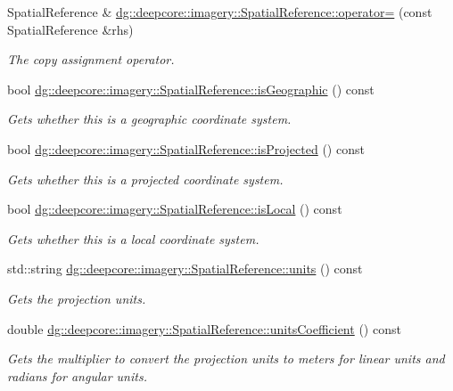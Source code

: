 \begin{DoxyCompactItemize}
Spatial\+Reference \& \hyperlink{group___imagery_module_ga57789396d3366fae0ec1fdc83832ee5b}{dg\+::deepcore\+::imagery\+::\+Spatial\+Reference\+::operator=} (const Spatial\+Reference \&rhs)
\begin{DoxyCompactList}\small\item\em The copy assignment operator. \end{DoxyCompactList}\item 
bool \hyperlink{group___imagery_module_ga2fcc958cf2ef9ab876162ac40df35913}{dg\+::deepcore\+::imagery\+::\+Spatial\+Reference\+::is\+Geographic} () const 
\begin{DoxyCompactList}\small\item\em Gets whether this is a geographic coordinate system. \end{DoxyCompactList}\item 
bool \hyperlink{group___imagery_module_ga0344d276d07a4f5a0ae3ae113a89026d}{dg\+::deepcore\+::imagery\+::\+Spatial\+Reference\+::is\+Projected} () const 
\begin{DoxyCompactList}\small\item\em Gets whether this is a projected coordinate system. \end{DoxyCompactList}\item 
bool \hyperlink{group___imagery_module_gad4b4d9d82c2ab268d523048576a1655e}{dg\+::deepcore\+::imagery\+::\+Spatial\+Reference\+::is\+Local} () const 
\begin{DoxyCompactList}\small\item\em Gets whether this is a local coordinate system. \end{DoxyCompactList}\item 
std\+::string \hyperlink{group___imagery_module_gac88786aa96148f649fc063229cebba89}{dg\+::deepcore\+::imagery\+::\+Spatial\+Reference\+::units} () const 
\begin{DoxyCompactList}\small\item\em Gets the projection units. \end{DoxyCompactList}\item 
double \hyperlink{group___imagery_module_gab96d28b4a4fc932393d3fc3d536e6a80}{dg\+::deepcore\+::imagery\+::\+Spatial\+Reference\+::units\+Coefficient} () const 
\begin{DoxyCompactList}\small\item\em Gets the multiplier to convert the projection units to meters for linear units and radians for angular units. \end{DoxyCompactList}\item 

\end{DoxyCompactItemize}
